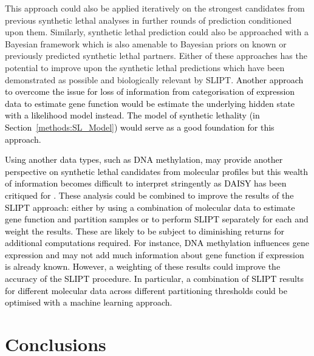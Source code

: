 This approach could also be applied iteratively on the strongest candidates from previous \gls{synthetic lethal} analyses in further rounds of prediction conditioned upon them. Similarly, \gls{synthetic lethal} prediction could also be approached with a Bayesian framework \citep{Friedman2000, Jansen2003, Imoto2004} which is also amenable to Bayesian priors on known or previously predicted \gls{synthetic lethal} partners. Either of these approaches has the potential to improve upon the \gls{synthetic lethal} predictions which have been demonstrated as possible and biologically relevant by \gls{SLIPT}. \textcolor{black}{Another approach to overcome the issue for loss of information from categorisation of expression data to estimate gene function would be estimate the underlying hidden state with a likelihood model instead. The model of synthetic lethality (in Section~\ref{methods:SL_Model}) would serve as a good foundation for this approach.}

\textcolor{black}{
Using another data types, such as DNA methylation, may provide another perspective on synthetic lethal candidates from molecular profiles but this wealth of information becomes difficult to interpret stringently as \gls{DAISY} has been critiqued for \citep{Lu2015}. These analysis could be combined to improve the results of the SLIPT approach: either by using a combination of molecular data to estimate gene function and partition samples or to perform SLIPT separately for each and weight the results. These are likely to be subject to diminishing returns for additional computations required. For instance, DNA methylation influences gene expression and may not add much information about gene function if expression is already known. However, a weighting of these results could improve the accuracy of the SLIPT procedure. In particular, a combination of SLIPT results for different molecular data across different partitioning thresholds could be optimised with a machine learning approach.   
}
\section{Conclusions}
\label{chap:conclusion}

